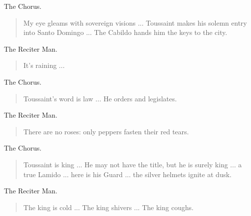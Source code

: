 \documentclass[letterpaper,article,12pt,oneside,notitlepage]{memoir}
\begin{document}
\begin{center}The Chorus.\end{center}

\begin{verse}
\indent My eye gleams with sovereign visions ... Toussaint makes his solemn entry into Santo Domingo ... The Cabildo hands him the keys to the city. \\
\end{verse}

\begin{center}The Reciter Man.\end{center}

\begin{verse}
It's raining ... \\
\end{verse}

\begin{center}The Chorus.\end{center}

\begin{verse}
\indent Toussaint's word is law ... He orders and legislates. \\
\end{verse}

\clearpage

\begin{center}The Reciter Man.\end{center}

\begin{verse}
\indent There are no roses: only peppers fasten their red tears. \\
\end{verse}

\begin{center}The Chorus.\end{center}

\begin{verse}
\indent Toussaint is king ... He may not have the title, but he is surely king ... a true Lamido ... here is his Guard ... the silver helmets ignite at dusk. \\
\end{verse}

\begin{center}The Reciter Man.\end{center}

\begin{verse}
The king is cold ... The king shivers ... The king coughs. \\
\end{verse}
\end{document}
